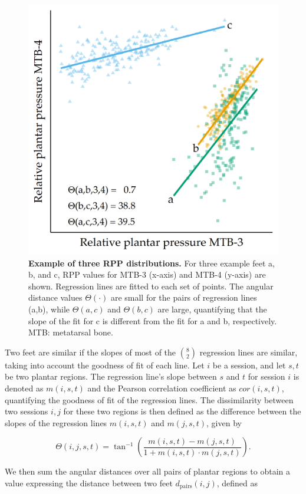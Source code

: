 \documentclass[
  oneside]{book}
\begin{document}
\begin{figure}[htb]

{\centering \includegraphics[width=0.5\linewidth]{figures/07-simpairs} 

}

\caption{\textbf{Example of three RPP distributions.} For three example feet a, b, and c, RPP values for MTB-3 (x-axis) and MTB-4 (y-axis) are shown. Regression lines are fitted to each set of points. The angular distance values \(\Theta(\cdot)\) are small for the pairs of regression lines (a,b), while \(\Theta(a,c)\) and \(\Theta(b,c)\) are large, quantifying that the slope of the fit for c is different from the fit for a and b, respectively. MTB: metatarsal bone.}\label{fig:07-simpairs}
\end{figure}

Two feet are similar if the slopes of most of the \(\binom{8}{2}\)
regression lines are similar, taking into account the goodness of fit of each line.
Let \(i\) be a session, and let \(s,t\) be two plantar regions.
The regression line's slope between \(s\) and \(t\) for session \(i\) is denoted as \(m(i,s,t)\) and the Pearson correlation coefficient as \(cor(i,s,t)\), quantifying the goodness of fit of the regression lines.
The dissimilarity between two sessions \(i,j\) for these two regions is then defined as the difference between the slopes of the regression lines \(m(i,s,t)\) and \(m(j,s,t)\), given by

\begin{equation}
\Theta(i,j,s,t) = \tan^{-1}\left(\frac{m(i,s,t)-m(j,s,t)}{1+m(i,s,t)\cdot m(j,s,t)}\right).
\label{eq:theta}
\end{equation}

We then sum the angular distances over all pairs of plantar regions to obtain a value expressing the distance between two feet \(d_{\text{pairs}}(i,j)\), defined as
\end{document}

